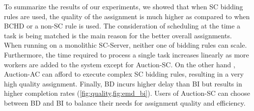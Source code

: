 To summarize the results of our experiments, we showed that when SC bidding rules are used, the quality of the assignment is much higher as compared to when BCHD or a non-SC rule is used. The consideration of scheduling at the time a task is being matched is the main reason for the better overall assignments. When running on a monolithic SC-Server, neither one of bidding rules can scale. Furthermore, the time required to process a single task increases linearly as more workers are added to the system except for Auction-SC. On the other hand , Auction-AC can afford to execute complex SC bidding rules, resulting in a very high quality assignment. Finally, BD incurs higher delay than BI but results in higher completion rates (\cref{fig:quality,fig:emd_bi}). Users of Auction-SC can choose between BD and BI to balance their needs for assignment quality and efficiency.

